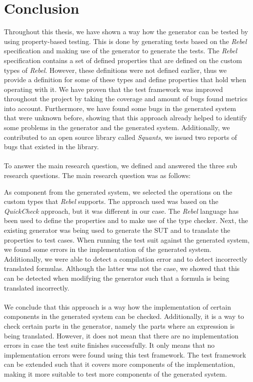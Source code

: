 \chapter{Conclusion}
\label{chp:conclusion}
Throughout this thesis, we have shown a way how the generator can be tested by
using property-based testing. This is done by generating tests based on the \textit{Rebel} specification and making use of the generator to generate the tests. The \textit{Rebel} specification contains a set of defined properties that are defined on the custom types of \textit{Rebel}. However, these definitions were not defined earlier, thus we provide a definition for some of these types and  define properties that hold when operating with it. We have proven that the test framework was improved throughout the project by taking the coverage and amount of bugs found metrics into account. Furthermore, we have found some bugs in the generated system that were unknown before, showing that this approach already helped to identify some problems in the generator and the generated system. Additionally, we contributed to an open source library called \textit{Squants}, we issued two reports of bugs that existed in the library.\\
\\
To answer the main research question, we defined and answered the three sub research questions. The main research question was as follows:
\begin{quote}
\rqMain
\end{quote}
As component from the generated system, we selected the operations on the custom types that \textit{Rebel} supports. The approach used was based on the \textit{QuickCheck} approach, but it was different in our case. The \textit{Rebel} language has been used to define the properties and to make use of the type checker. Next, the existing generator was being used to generate the SUT and to translate the properties to test cases. When running the test suit against the generated system, we found some errors in the implementation of the generated system. Additionally, we were able to detect a compilation error and to detect incorrectly translated formulas. Although the latter was not the case, we showed that this can be detected when modifying the generator such that a formula is being translated incorrectly.\\
\\
We conclude that this approach is a way how the implementation of certain components in the generated system can be checked. Additionally, it is a way to check certain parts in the generator, namely the parts where an expression is being translated. However, it does not mean that there are no implementation errors in case the test suite finishes successfully. It only means that no implementation errors were found using this test framework. The test framework can be extended such that it covers more components of the implementation, making it more suitable to test more components of the generated system.

